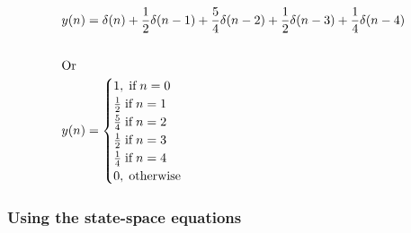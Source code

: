 \documentclass{article}
\renewcommand{\thesubsubsection}{\thesection.\alph{subsection}.\Roman{subsubsection}}
\begin{document}
\begin{align*}
	y(n) &= \delta(n) + \frac{1}{2}\delta(n - 1) + \frac{5}{4}\delta(n - 2) + \frac{1}{2}\delta(n - 3) + \frac{1}{4}\delta(n - 4) \\\\
	\intertext{\centering Or}
	y(n) &= \begin{cases} 1, \; \text{if} \; n = 0 \\ \frac{1}{2} \; \text{if} \; n = 1 \\ \frac{5}{4} \; \text{if} \; n = 2 \\ \frac{1}{2} \; \text{if} \; n = 3 \\ \frac{1}{4} \; \text{if} \; n = 4 \\0, \; \text{otherwise} \end{cases}
\end{align*}

\subsubsection[~\thesubsubsection]{Using the state-space equations}
\end{document}
